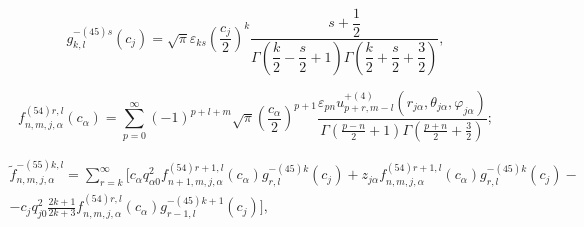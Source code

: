 \begin{equation}
g_{k,l}^{ - (45)s}({c_j}) = \sqrt \pi  {\varepsilon _{ks}}{\left( {\dfrac{{{c_j}}}{2}} \right)^k}\dfrac{{s + \dfrac{1}{2}}}{{\Gamma \left( {\dfrac{k}{2} - \dfrac{s}{2} + 1} \right)\Gamma \left( {\dfrac{k}{2} + \dfrac{s}{2} + \dfrac{3}{2}} \right)}},
\label{eq:9:11}
\end{equation}

\begin{equation}
f_{n,m,j,\alpha}^{(54)r,l}({c_\alpha}) = \sum\limits_{p = 0}^\infty  {{{( - 1)}^{p + l + m}}} \sqrt \pi  {\left( {\frac{{{c_\alpha}}}{2}} \right)^{p + 1}}\frac{{{\varepsilon _{pn}}u_{p + r,m - l}^{ + (4)}\left( {{r_{j\alpha}},{\theta _{j\alpha}},{\varphi _{j\alpha}}} \right)}}{{\Gamma \left( {\frac{{p - n}}{2} + 1} \right)\Gamma \left( {\frac{{p + n}}{2} + \frac{3}{2}} \right)}};
\label{eq:9:12}
\end{equation}

\begin{multline}
\tilde f_{n,m,j,\alpha}^{ - (55)k,l} = \sum\limits_{r = k}^\infty  \bigg[ {c_\alpha}q_{\alpha 0}^2f_{n + 1,m,j,\alpha}^{(54)r + 1,l}({c_\alpha})g_{r,l}^{ - (45)k}({c_j}) + {z_{j\alpha}}f_{n,m,j,\alpha}^{(54)r + 1,l}({c_\alpha})g_{r,l}^{ - (45)k}({c_j}) - \\
- {c_j}q_{j0}^2\frac{{2k + 1}}{{2k + 3}}f_{n,m,j,\alpha}^{(54)r,l}({c_\alpha})g_{r - 1,l}^{ - (45)k + 1}({c_j}) \bigg],
\label{eq:9:13}
\end{multline}

